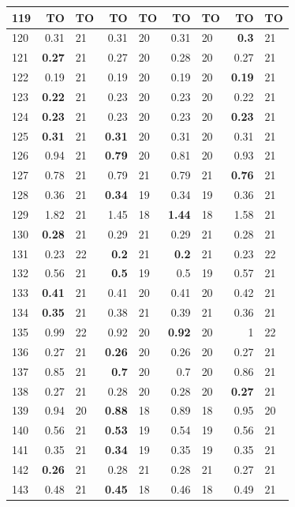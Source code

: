 \begin{longtable}{lr@{\hskip 4pt}l@{\hskip 12pt}r@{\hskip 4pt}l@{\hskip 12pt}r@{\hskip 4pt}l@{\hskip 12pt}r@{\hskip 4pt}l@{\hskip 12pt}}
119 & TO & TO & TO & TO & TO & TO & TO & TO \\
\midrule
120 & 0.31 & 21 & 0.31 & 20 & 0.31 & 20 & \textbf{0.3} & 21 \\
121 & \textbf{0.27} & 21 & 0.27 & 20 & 0.28 & 20 & 0.27 & 21 \\
122 & 0.19 & 21 & 0.19 & 20 & 0.19 & 20 & \textbf{0.19} & 21 \\
123 & \textbf{0.22} & 21 & 0.23 & 20 & 0.23 & 20 & 0.22 & 21 \\
124 & \textbf{0.23} & 21 & 0.23 & 20 & 0.23 & 20 & \textbf{0.23} & 21 \\
125 & \textbf{0.31} & 21 & \textbf{0.31} & 20 & 0.31 & 20 & 0.31 & 21 \\
126 & 0.94 & 21 & \textbf{0.79} & 20 & 0.81 & 20 & 0.93 & 21 \\
127 & 0.78 & 21 & 0.79 & 21 & 0.79 & 21 & \textbf{0.76} & 21 \\
128 & 0.36 & 21 & \textbf{0.34} & 19 & 0.34 & 19 & 0.36 & 21 \\
129 & 1.82 & 21 & 1.45 & 18 & \textbf{1.44} & 18 & 1.58 & 21 \\
130 & \textbf{0.28} & 21 & 0.29 & 21 & 0.29 & 21 & 0.28 & 21 \\
131 & 0.23 & 22 & \textbf{0.2} & 21 & \textbf{0.2} & 21 & 0.23 & 22 \\
132 & 0.56 & 21 & \textbf{0.5} & 19 & 0.5 & 19 & 0.57 & 21 \\
133 & \textbf{0.41} & 21 & 0.41 & 20 & 0.41 & 20 & 0.42 & 21 \\
134 & \textbf{0.35} & 21 & 0.38 & 21 & 0.39 & 21 & 0.36 & 21 \\
135 & 0.99 & 22 & 0.92 & 20 & \textbf{0.92} & 20 & 1 & 22 \\
136 & 0.27 & 21 & \textbf{0.26} & 20 & 0.26 & 20 & 0.27 & 21 \\
137 & 0.85 & 21 & \textbf{0.7} & 20 & 0.7 & 20 & 0.86 & 21 \\
138 & 0.27 & 21 & 0.28 & 20 & 0.28 & 20 & \textbf{0.27} & 21 \\
139 & 0.94 & 20 & \textbf{0.88} & 18 & 0.89 & 18 & 0.95 & 20 \\
140 & 0.56 & 21 & \textbf{0.53} & 19 & 0.54 & 19 & 0.56 & 21 \\
141 & 0.35 & 21 & \textbf{0.34} & 19 & 0.35 & 19 & 0.35 & 21 \\
142 & \textbf{0.26} & 21 & 0.28 & 21 & 0.28 & 21 & 0.27 & 21 \\
143 & 0.48 & 21 & \textbf{0.45} & 18 & 0.46 & 18 & 0.49 & 21 \\

\end{longtable}

